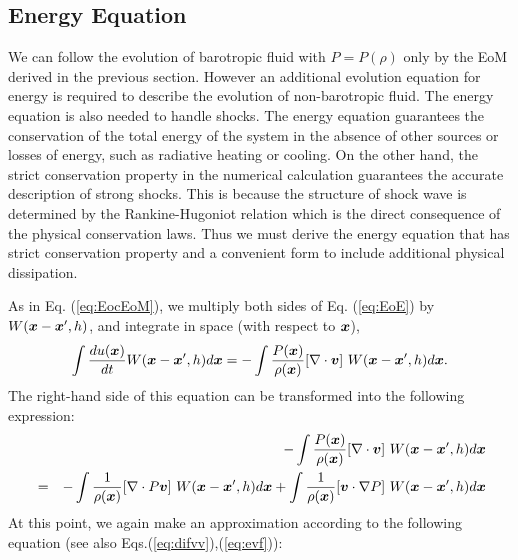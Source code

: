 \documentclass{cjour}
\newcommand{ \Vec   }[1]{ \mbox{\boldmath $ #1 $} }
\begin{document}
\begin{article}
 \subsection{Energy Equation}
                                                   \label{Sec:Energy}
We can follow the evolution of barotropic fluid with $P=P(\rho)$ 
only by the EoM derived in the previous section. 
However an additional evolution equation for energy 
is required to describe the evolution of non-barotropic fluid.  
The energy equation is also needed to handle shocks.  
The energy equation guarantees the conservation of the total energy 
of the system in the absence of other sources or losses of energy, 
such as radiative heating or cooling.  
On the other hand, 
the strict conservation property in the numerical calculation 
guarantees the accurate description of strong shocks.  
This is because the structure of shock wave is determined by 
the Rankine-Hugoniot relation which is the direct consequence 
of the physical conservation laws. 
Thus we must derive the energy equation that has 
strict conservation property and a convenient form 
to include additional physical dissipation. 



As in Eq. (\ref{eq:EocEoM}), 
we multiply both sides of Eq. (\ref{eq:EoE}) by 
$W(\Vec{x}-\Vec{x}', h)$, 
and integrate in space (with respect to $\Vec{x}$), 
\begin{equation}
       \int \frac{ d u(\Vec{x}) }{ dt } 
                                W(\Vec{x}-\Vec{x}',h) d\Vec{x} =
     - \int \frac{P(\Vec{x})}{\rho(\Vec{x})} [\nabla \cdot \Vec{v}]~
                                W(\Vec{x}-\Vec{x}',h) d\Vec{x}. 
                                               \label{eq:EocEoE}
\end{equation}
The right-hand side of this equation can be transformed into 
the following expression: 
\begin{eqnarray}
 &   &  - \int \frac{P(\Vec{x})}{\rho(\Vec{x})} [\nabla \cdot \Vec{v}]~
                                W(\Vec{x}-\Vec{x}',h) d\Vec{x}   
                                                      \nonumber \\
 & = &  - \int \frac{1}{\rho(\Vec{x})} [\nabla \cdot P \Vec{v}]~
                                W(\Vec{x}-\Vec{x}',h) d\Vec{x}   
        + \int \frac{1}{\rho(\Vec{x})} [\Vec{v} \cdot \nabla P]~
                                W(\Vec{x}-\Vec{x}',h) d\Vec{x}  
                                                      \nonumber \\
\end{eqnarray}
At this point, we again make an approximation according to 
the following equation 
(see also Eqs.(\ref{eq:difvv}),(\ref{eq:evf})): 
                                       

\end{article}
\end{document}
